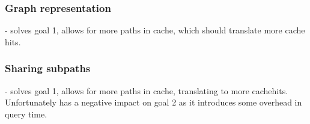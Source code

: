\subsubsection{Graph representation} - solves goal 1, allows for more paths in cache, which should translate more cache hits.

\subsubsection{Sharing subpaths} - solves goal 1, allows for more paths in cache, translating to more cachehits. Unfortunately has a negative impact on goal 2 as it introduces some overhead in query time.

